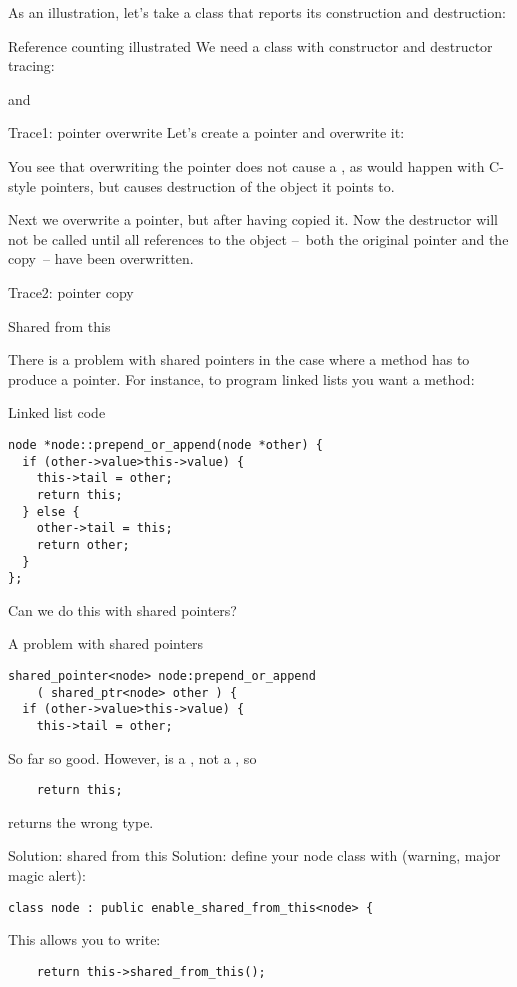 As an illustration, let's take a class that reports its construction
and destruction:
%
\begin{block}{Reference counting illustrated}
  \label{sl:construct-destruct-trace}
  We need a class with constructor and destructor tracing:
\end{block}

%
and
\begin{block}{Trace1: pointer overwrite}
  \label{sl:shared-ptr-overwrite}
  Let's create a pointer and overwrite it:
\end{block}
%
You see that overwriting the pointer does not cause a
, as would happen with C-style pointers, but
causes destruction of the object it points to.

Next we overwrite a pointer, but after having copied it. Now the
destructor will not be called until all references to the object
--~both the original pointer and the copy~-- have been overwritten.
%
\begin{block}{Trace2: pointer copy}
  \label{sl:shared-ptr-copy}
\end{block}

 {Shared from this}

There is a problem with shared pointers in the case where a method has
to produce a pointer. For instance, to program linked lists you want a
method:
\begin{slide}{Linked list code}
  \label{sl:share-ptr-node}  
\begin{verbatim}
node *node::prepend_or_append(node *other) {
  if (other->value>this->value) {
    this->tail = other;
    return this;
  } else {
    other->tail = this;
    return other;
  }
};
\end{verbatim}
Can we do this with shared pointers?
\end{slide}

\begin{block}{A problem with shared pointers}
  \label{sl:share-ptr-node-sh}
\begin{verbatim}
shared_pointer<node> node:prepend_or_append
    ( shared_ptr<node> other ) {
  if (other->value>this->value) {
    this->tail = other;
\end{verbatim}
So far so good. However,  is a , not a
, so
\begin{verbatim}
    return this;
\end{verbatim}
returns the wrong type.
\end{block}

\begin{block}{Solution: shared from this}
  \label{sl:share-ptr-node-from}
  Solution: define your node class with (warning, major magic alert):
\begin{verbatim}
class node : public enable_shared_from_this<node> {
\end{verbatim}
This allows you to write:
\begin{verbatim}
    return this->shared_from_this();
\end{verbatim}
\end{block}
